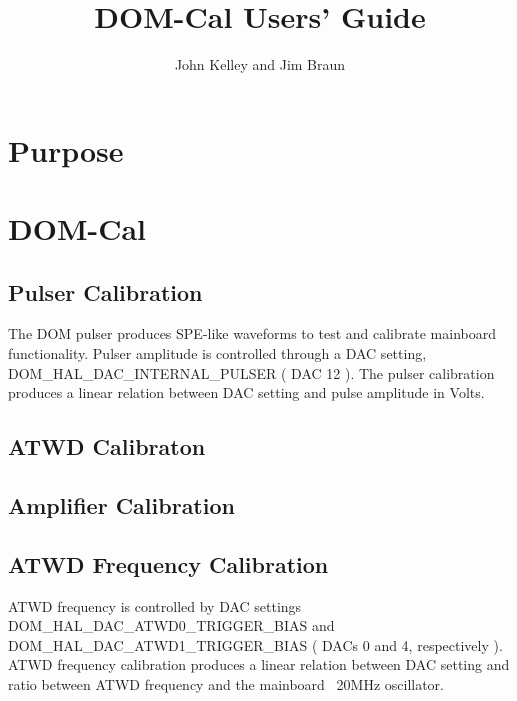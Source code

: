 \documentclass[10pt]{article}
\begin{document}
                                                                                
\baselineskip=16pt
\def\Z{{\bf Z}}
                                                                                
\newcommand{\infinity}{\infty}
                                                                                
\title{DOM-Cal Users' Guide}
\author{John Kelley and Jim Braun}
\maketitle
                                                                                
\newpage

\section{Purpose}

\section{DOM-Cal}

\subsection{Pulser Calibration}

The DOM pulser produces SPE-like waveforms to test and calibrate mainboard
functionality.  Pulser amplitude is controlled through a DAC setting,
DOM\_HAL\_DAC\_INTERNAL\_PULSER ( DAC 12 ).  The pulser calibration
produces a linear relation between DAC setting and pulse amplitude in Volts.

\subsection{ATWD Calibraton}

\subsection{Amplifier Calibration}

\subsection{ATWD Frequency Calibration}

ATWD frequency is controlled by DAC settings DOM\_HAL\_DAC\_ATWD0\_TRIGGER\_BIAS and
DOM\_HAL\_DAC\_ATWD1\_TRIGGER\_BIAS ( DACs 0 and 4, respectively ).  ATWD frequency
calibration produces a linear relation between DAC setting and ratio between ATWD
frequency and the mainboard ~20MHz oscillator.
\end{document}
